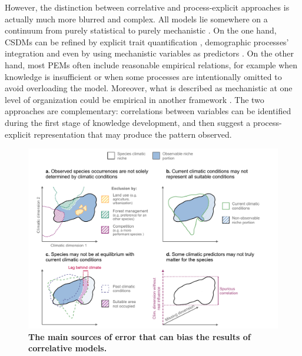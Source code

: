 However, the distinction between correlative and process-explicit approaches is actually much more blurred and complex. All models lie somewhere on a continuum from purely statistical to purely mechanistic \citep{Korzukhin1996, Dormann2012}. On the one hand, CSDMs can be refined by explicit trait quantification \citep{BenitoGarzon2019}, demographic processes' integration \citep{Normand2014} and even by using mechanistic variables as predictors \citep{Mathewson2017}. On the other hand, most PEMs often include reasonable empirical relations, for example when knowledge is insufficient or when some processes are intentionally omitted to avoid overloading the model. Moreover, what is described as mechanistic at one level of organization could be empirical in another framework \citep{ONeill1987}. The two approaches are complementary: correlations between variables can be identified during the first stage of knowledge development, and then suggest a process-explicit representation that may produce the pattern observed. 


\begin{figure}[hp]
\vspace*{-0cm}
\hspace*{-0.8cm}
\centering
\begin{subcaptiongroup}
\label{fig:sdmissuesA} 
\label{fig:sdmissuesB}
\label{fig:sdmissuesC}
\label{fig:sdmissuesD}
\end{subcaptiongroup}
\includegraphics{0introduction/figs/sdm_issue.pdf}
\caption{\textbf{The main sources of error that can bias the results of correlative models.}}
\vspace*{-0.5cm}
\label{fig:csdmissues}
\end{figure}

